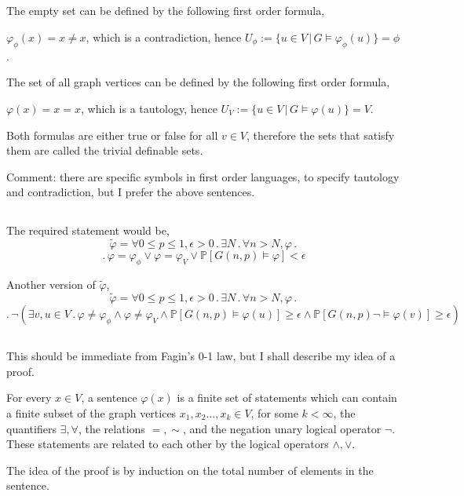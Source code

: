 \documentclass{article}
\begin{document}
\subsection{}
The empty set can be defined by the following first order formula,

$\varphi_\phi(x)=x\neq{x}$, which is a contradiction, hence $U_\phi:=\{u\in{V}\,|\,{G\vDash\varphi_\phi(u)}\}=\phi$.

The set of all graph vertices can be defined by the following first order formula,

$\varphi(x)=x=x$, which is a tautology, hence $U_V:=\{u\in{V}\,|\,{G\vDash\varphi(u)}\}=V$.

Both formulas are either true or false for all $v\in{V}$, therefore the sets that satisfy them are called the trivial definable sets.

Comment: there are specific symbols in first order languages, to specify tautology and contradiction, but I prefer the above sentences.
\subsection{}
The required statement would be,
\noindent
\[\tilde\varphi=\forall{0\leq{p}\leq{1}},\epsilon>0\,.\,\exists{N}\,.\,\forall{n>N},\varphi\,.\,\]\[.\,\varphi=\varphi_\phi\lor\varphi=\varphi_V\lor\mathbb{P}[G(n,p)\vDash\varphi]<\epsilon\]

Another version of $\tilde\varphi$,
\noindent
\[\tilde\varphi=\forall{0\leq{p}\leq{1}},\epsilon>0\,.\,\exists{N}\,.\,\forall{n>N},\varphi\,.\,\]\[.\,\neg(\exists{v,u\in{V}}\,.\,\varphi\neq\varphi_\phi\land\varphi\neq\varphi_V\land\mathbb{P}[G(n,p)\vDash\varphi(u)]\geq\epsilon\land\mathbb{P}[G(n,p)\neg\vDash\varphi(v)]\geq\epsilon)\]
\subsection{}
This should be immediate from Fagin's 0-1 law, but I shall describe my idea of a proof.

For every $x\in{V}$, a sentence $\varphi(x)$ is a finite set of statements which can contain a finite subset of the graph vertices $x_1,x_2\dots,x_k\in{V}$, for some $k<\infty$, the quantifiers $\exists,\forall$, the relations $=,\sim$, and the negation unary logical operator $\neg$. These statements are related to each other by the logical operators $\land,\lor$.

The idea of the proof is by induction on the total number of elements in the sentence.
\end{document}
